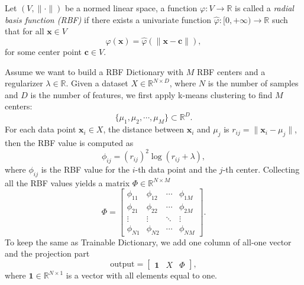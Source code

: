 \documentclass[en, bibend=bibtex]{elegantpaper}
\theoremstyle{plain}
\begin{document}
\begin{definition}
  Let $(V, \|\cdot\|)$ be a normed linear space,
  a function $\varphi: V \rightarrow \mathbb{R}$ is called
  a \emph{radial basis function (RBF)} if
  there exists a univariate function $\hat{\varphi}: [0, +\infty) \rightarrow \mathbb{R}$
  such that for all $\mathbf{x} \in V$
  \begin{equation*}
   \varphi(\mathbf{x}) = \hat{\varphi}(\|\mathbf{x} - \mathbf{c}\|),
  \end{equation*}
  for some center point $\mathbf{c} \in V$.
\end{definition}

Assume we want to build a RBF Dictionary
with $M$ RBF centers and a regularizer $\lambda \in \mathbb{R}$.
Given a dataset $X \in \mathbb{R}^{N \times D}$,
where $N$ is the number of samples and
$D$ is the number of features,
we first apply k-means clustering to find $M$ centers:
\begin{equation*}
  \{\mu_1, \mu_2, \cdots, \mu_M\} \subset \mathbb{R}^D.
\end{equation*}
For each data point $\mathbf{x}_i \in X$,
the distance between $\mathbf{x}_i$ and $\mu_j$ is
$r_{ij} = \|\mathbf{x}_i - \mu_j\|$,
then the RBF value is computed as
\begin{equation*}
  \phi_{ij} = (r_{ij})^2 \log(r_{ij} + \lambda),
\end{equation*}
where $\phi_{ij}$ is the RBF value for the
$i$-th data point and the $j$-th center.
Collecting all the RBF values yields a matrix $\Phi \in \mathbb{R}^{N \times M}$
\begin{equation*}
  \Phi = \left[
    \begin{array}{cccc}
      \phi_{11}&\phi_{12}&\cdots&\phi_{1M}\\
      \phi_{21}&\phi_{22}&\cdots&\phi_{2M}\\
      \vdots & \vdots & \ddots & \vdots\\
      \phi_{N1}&\phi_{N2}&\cdots&\phi_{NM}
    \end{array}
  \right].
\end{equation*}
To keep the same as Trainable Dictionary,
we add one column of all-one vector and
the projection part
\begin{equation*}
  \text{output} = \left[
    \begin{array}{ccc}
      \mathbf{1}&X&\Phi
    \end{array}
  \right],
\end{equation*}
where $\mathbf{1} \in \mathbb{R}^{N\times 1}$ is a vector with all elements
equal to one.
\end{document}
